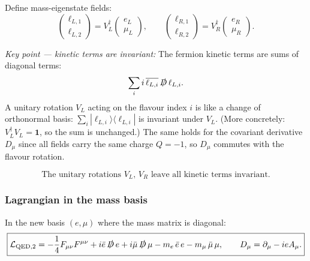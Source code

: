 \documentclass[../main.tex]{subfiles}
\begin{document}
Define mass-eigenstate fields:
\begin{equation}
  \begin{pmatrix}\ell_{L,1}\\\ell_{L,2}\end{pmatrix}
  = V_L^\dagger
  \begin{pmatrix}e_L\\\mu_L\end{pmatrix},
  \qquad
  \begin{pmatrix}\ell_{R,1}\\\ell_{R,2}\end{pmatrix}
  = V_R^\dagger
  \begin{pmatrix}e_R\\\mu_R\end{pmatrix}.
  \label{eq:lec11:mass-eigenstates}
\end{equation}

\textit{Key point — kinetic terms are invariant:}  The fermion kinetic terms are sums of diagonal terms:
\[
  \sum_i i\,\overline{\ell_{L,i}}\,\slashed{D}\,\ell_{L,i}.
\]
A unitary rotation $V_L$ acting on the flavour index $i$ is like a change of orthonormal basis: $\sum_i |\ell_{L,i}\rangle\langle\ell_{L,i}|$ is invariant under $V_L$.  (More concretely: $V_L^\dagger V_L = \mathbf{1}$, so the sum is unchanged.)  The same holds for the covariant derivative $D_\mu$ since all fields carry the same charge $Q=-1$, so $D_\mu$ commutes with the flavour rotation.

\begin{equation}
  \boxed{
  \text{The unitary rotations }V_L,\,V_R\text{ leave all kinetic terms invariant.}}
  \label{eq:lec11:kinetic-invariant}
\end{equation}

\subsubsection*{Lagrangian in the mass basis}

In the new basis $(e,\mu)$ where the mass matrix is diagonal:
\begin{equation}
  \boxed{
  \mathcal{L}_{\mathrm{QED},2}
  =
  -\frac{1}{4}F_{\mu\nu}F^{\mu\nu}
  + i\bar{e}\,\slashed{D}\,e
  + i\bar{\mu}\,\slashed{D}\,\mu
  - m_e\,\bar{e}\,e
  - m_\mu\,\bar{\mu}\,\mu,
  \qquad D_\mu = \partial_\mu - ie A_\mu.}
  \label{eq:lec11:qed2-lagrangian}
\end{equation}
\end{document}
